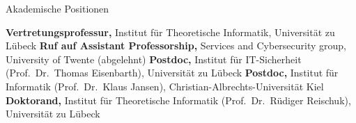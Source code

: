\begin{rubric}{Akademische Positionen}

  \textbf{Vertretungsprofessur,} Institut für Theoretische Informatik, Universität zu Lübeck
  \entry*[2022]%
  \textbf{Ruf auf Assistant Professorship,} Services and Cybersecurity group, University of Twente (abgelehnt)
  \entry*[2020--2022]%
  \textbf{Postdoc,} Institut für IT-Sicherheit (Prof.~Dr.~Thomas Eisenbarth), Universität zu Lübeck
  \entry*[2017--2020]%
  \textbf{Postdoc,} Institut für Informatik (Prof.~Dr.~Klaus Jansen), Christian-Albrechts-Universität Kiel
  \entry*[2012--2017]%
 \textbf{Doktorand,} Institut für Theoretische Informatik (Prof.~Dr.~Rüdiger Reischuk), Universität zu Lübeck

%
\end{rubric}